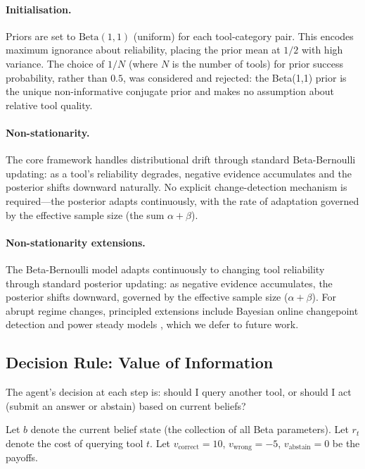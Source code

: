 \documentclass[11pt]{article}
\newcommand{\Beta}{\mathrm{Beta}}
\begin{document}
\paragraph{Initialisation.} Priors are set to $\Beta(1, 1)$ (uniform) for each tool-category pair. This encodes maximum ignorance about reliability, placing the prior mean at $1/2$ with high variance. The choice of $1/N$ (where $N$ is the number of tools) for prior success probability, rather than $0.5$, was considered and rejected: the Beta(1,1) prior is the unique non-informative conjugate prior and makes no assumption about relative tool quality.

\paragraph{Non-stationarity.} The core framework handles distributional drift through standard Beta-Bernoulli updating: as a tool's reliability degrades, negative evidence accumulates and the posterior shifts downward naturally. No explicit change-detection mechanism is required---the posterior adapts continuously, with the rate of adaptation governed by the effective sample size (the sum $\alpha + \beta$).

\paragraph{Non-stationarity extensions.} The Beta-Bernoulli model adapts continuously to changing tool reliability through standard posterior updating: as negative evidence accumulates, the posterior shifts downward, governed by the effective sample size ($\alpha + \beta$). For abrupt regime changes, principled extensions include Bayesian online changepoint detection \citep{adams2007changepoint} and power steady models \citep{freeman2011dynamic}, which we defer to future work.

\subsection{Decision Rule: Value of Information}
\label{sec:voi}

The agent's decision at each step is: should I query another tool, or should I act (submit an answer or abstain) based on current beliefs?

Let $b$ denote the current belief state (the collection of all Beta parameters). Let $r_t$ denote the cost of querying tool $t$. Let $v_{\text{correct}} = 10$, $v_{\text{wrong}} = -5$, $v_{\text{abstain}} = 0$ be the payoffs.
\end{document}
